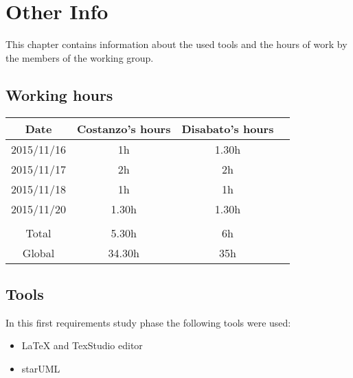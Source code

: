 \documentclass[\mainpath/main]{subfiles}
\begin{document}
\chapter{Other Info}
\label{other_info}

\setmyfancystyle

This chapter contains information about the used tools and the hours of work by the members of the working group.

\section{Working hours}
\begin{table}[h!]
\begin{tabular}{cccc}
\hline
Date & Costanzo's hours & Disabato's hours  &    \\ \hline
2015/11/16 & 1h & 1.30h &    \\ \hline
2015/11/17 & 2h & 2h &    \\ \hline 
2015/11/18 & 1h & 1h &    \\ \hline
2015/11/20 & 1.30h & 1.30h &    \\ \hline \\
Total & 5.30h & 6h & \\ \hline
Global & 34.30h & 35h & \\ \hline

\end{tabular}
\end{table}

\section{Tools}
In this first requirements study phase the following tools were used:
\begin{itemize}
	\item \LaTeX{} and TexStudio editor
	\item starUML
\end{itemize}
\end{document}
